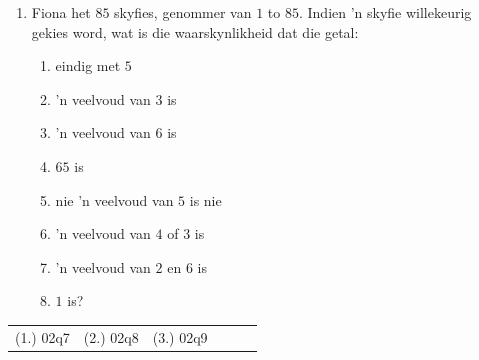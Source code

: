 \begin{exercises}{}
{\begin{enumerate}[itemsep=3pt, label=\textbf{\arabic*}.]
  \item Fiona het $85$ skyfies, genommer van $1$ to
    $85$. Indien 'n skyfie willekeurig gekies word, wat is die waarskynlikheid dat die getal: 
    \begin{enumerate}[noitemsep, label=\textbf{(\alph*)} ]
    \item eindig met $5$
    \item 'n veelvoud van $3$ is
    \item 'n veelvoud van $6$ is
    \item $65$ is
    \item nie 'n veelvoud van $5$ is nie
    \item 'n veelvoud van $4$ of $3$ is
    \item 'n veelvoud van $2$ en $6$ is
    \item  $1$ is?
    \end{enumerate}
  \end{enumerate}

\par \practiceinfo
\par \begin{tabular}[h]{cccccc}
(1.)	02q7	&
(2.)	02q8	&
(3.)	02q9	&
\end{tabular}
}
\end{exercises}


